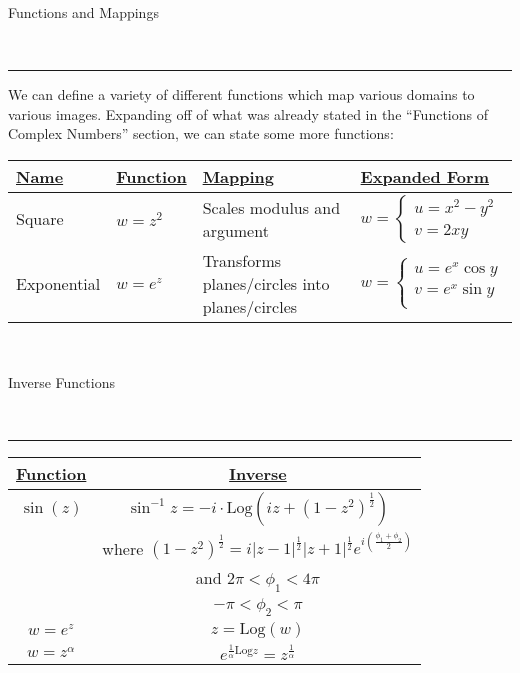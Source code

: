 \documentclass{article}
\newcommand{\header}[1]{\begin{large}\noindent #1\end{large}\\\rule{\textwidth}{0.5pt}}
\newcommand{\gap}{\medskip\\}
\newcommand{\Log}{\textrm{Log}}
\begin{document}
    \header{Functions and Mappings}

    We can define a variety of different functions which map various domains to 
    various images. Expanding off of what was already stated in the ``Functions of
    Complex Numbers'' section, we can state some more functions:
    \gap
    \bgroup
    \def\arraystretch{1.5}%
    \begin{tabular}{ |l|l|l|l| } 
        \hline
        \underline{Name} & \underline{Function} & \underline{Mapping} & \underline{Expanded Form} \\
        \hline
        Square  & $w = z^2$  & Scales modulus and argument & $w = \begin{cases}
            u = x^2 - y^2\\
            v = 2xy
        \end{cases}$   \\
        \hline
        Exponential & $w = e^z$ & Transforms planes/circles into planes/circles & $w = \begin{cases}
            u = e^x \cos y\\
            v = e^x \sin y\\
        \end{cases}$  \\
        \hline
    \end{tabular}
    \egroup
    \gap
    
    \header{Inverse Functions}
    \bgroup
    \def\arraystretch{1.5}%
    \begin{tabular}{ |c|c| } 
        \hline
        \underline{Function} & \underline{Inverse} \\
        \hline
        $ \sin(z)$ & $\sin^{-1}z = -i\cdot\Log(iz + (1-z^2)^{\frac{1}{2}})$ \\
        & where $(1 - z^2)^{\frac{1}{2}} = i|z-1|^\frac{1}{2} |z + 1|^\frac{1}{2}e^{i\left(\frac{\phi_1 + \phi_2}{2}\right)} $\\
        & and $2\pi < \phi_1 < 4\pi$\\
        & $ -\pi < \phi_2 < \pi$\\
        \hline
        $w = e^z$ & $z = \Log(w)$\\
        \hline
        $w = z^\alpha$ & $e^{\frac{1}{\alpha} \Log z} = z^{\frac{1}{\alpha}}$\\
        \hline
    \end{tabular}
    \egroup
\end{document}
